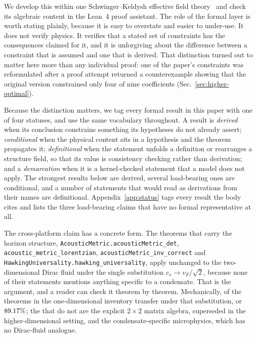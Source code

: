 \documentclass[aps,prd,reprint,nofootinbib,superscriptaddress]{revtex4-2}
\begin{document}
We develop this within one Schwinger--Keldysh effective field
theory~\cite{CGL2017a,Crossley2017II,GloriosoLiu2018,Jana2020} and check
its algebraic content in the Lean~4 proof assistant. The role of the
formal layer is worth stating plainly, because it is easy to overstate
and easier to under-use. It does not verify physics. It verifies that a
stated set of constraints has the consequences claimed for it, and it is
unforgiving about the difference between a constraint that is assumed
and one that is derived. That distinction turned out to matter here more
than any individual proof: one of the paper's constraints was
reformulated after a proof attempt returned a counterexample showing
that the original version constrained only four of nine coefficients
(Sec.~\ref{sec:higher-optimal}).

Because the distinction matters, we tag every formal result in this
paper with one of four statuses, and use the same vocabulary throughout.
A result is \emph{derived} when its conclusion constrains something its
hypotheses do not already assert; \emph{conditional} when the physical
content sits in a hypothesis and the theorem propagates it;
\emph{definitional} when the statement unfolds a definition or
rearranges a structure field, so that its value is consistency checking
rather than derivation; and a \emph{demarcation} when it is a
kernel-checked statement that a model does not apply. The
strongest results below are derived, several load-bearing ones are
conditional, and a number of statements that would read as derivations
from their names are definitional. Appendix~\ref{app:status} tags every
result the body cites and lists the three load-bearing claims that have
no formal representative at all.

The cross-platform claim has a concrete form. The theorems that carry
the horizon structure, \texttt{AcousticMetric.acousticMetric\_det},
\texttt{acoustic\_metric\_lorentzian},
\texttt{acousticMetric\_inv\_correct} and
\texttt{HawkingUniversality.hawking\_universality}, apply unchanged to
the two-dimensional Dirac fluid under the single substitution
$c_s \to v_F/\sqrt{2}$, because none of their statements mentions
anything specific to a condensate. That is the argument, and a reader
can check it theorem by theorem. Mechanically,
\reuseTransferred{} of the \reusePopulation{} theorems in the
one-dimensional inventory transfer under that substitution, or
$89.17\%$; the \reuseSpecific{} that do not are the explicit
$2\times2$ matrix algebra, superseded in the higher-dimensional setting,
and the condensate-specific microphysics, which has no Dirac-fluid
analogue.
\end{document}

